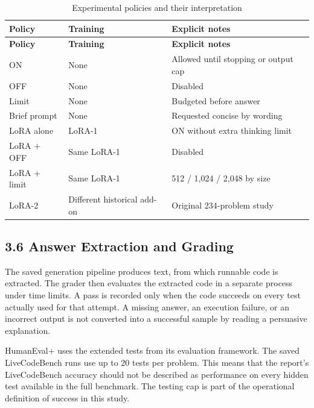 \documentclass[11pt,letterpaper]{article}
\begin{document}
\begingroup\singlespacing\small\setlength{\tabcolsep}{4pt}
\begin{longtable}{|p{1.997in}|p{1.997in}|p{1.997in}|}
\caption{Experimental policies and their interpretation}\label{tab:policies}\\
\hline
\textbf{Policy} & \textbf{Training} & \textbf{Explicit notes}\\\hline
\endfirsthead
\hline
\textbf{Policy} & \textbf{Training} & \textbf{Explicit notes}\\\hline
\endhead
ON & None & Allowed until stopping or output cap\\\hline
OFF & None & Disabled\\\hline
Limit & None & Budgeted before answer\\\hline
Brief prompt & None & Requested concise by wording\\\hline
LoRA alone & LoRA-1 & ON without extra thinking limit\\\hline
LoRA + OFF & Same LoRA-1 & Disabled\\\hline
LoRA + limit & Same LoRA-1 & 512 / 1,024 / 2,048 by size\\\hline
LoRA-2 & Different historical add-on & Original 234-problem study\\\hline
\end{longtable}
\endgroup

\subsection*{3.6 Answer Extraction and Grading}

The saved generation pipeline produces text, from which runnable code is extracted. The grader then evaluates the extracted code in a separate process under time limits. A pass is recorded only when the code succeeds on every test actually used for that attempt. A missing answer, an execution failure, or an incorrect output is not converted into a successful sample by reading a persuasive explanation.\par

HumanEval+ uses the extended tests from its evaluation framework. The saved LiveCodeBench runs use up to 20 tests per problem. This means that the report's LiveCodeBench accuracy should not be described as performance on every hidden test available in the full benchmark. The testing cap is part of the operational definition of success in this study.\par
\end{document}
